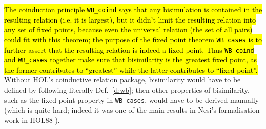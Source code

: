 \hl{The coinduction principle \texttt{WB_coind} says that any
bisimulation is contained in the resulting relation (i.e. it is
largest), but it didn't limit the resulting relation into any set of
fixed points, because even the universal relation (the set of all pairs)
could fit with this theorem; the
purpose of the fixed point theorem \texttt{WB_cases} is to
further assert that the resulting relation is indeed a
fixed point. Thus \texttt{WB_coind} and \texttt{WB_cases}
together make sure that bisimilarity is the greatest
fixed point, as
the former contributes to ``greatest'' while the latter
contributes to ``fixed point''.}
%
Without HOL's coinductive relation package, bisimilarity
would have to be defined by following literally
Def.~\ref{d:wb};  then other properties of bisimilarity, such
as the fixed-point property in \texttt{WB_cases}, would have to be
derived manually (which is quite hard; indeed it was one of the main results
in Nesi's formalisation work  in HOL88 \cite{Nesi:1992ve}).

